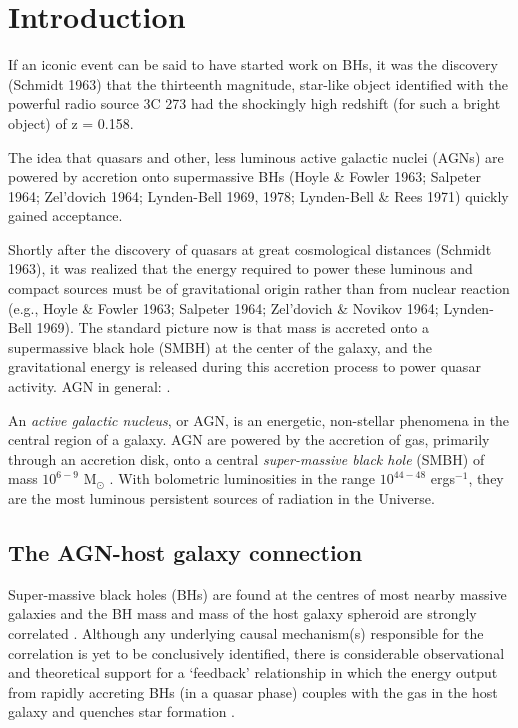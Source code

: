 
\chapter{Introduction}
\label{ch:intro}

If an iconic event can be said to have started work on BHs, it was the discovery (Schmidt
1963) that the thirteenth magnitude, star-like object identified with the powerful radio source 3C
273 had the shockingly high redshift (for such a bright object) of z = 0.158.

The idea that quasars and other, less luminous active galactic nuclei (AGNs) are powered by accretion onto supermassive BHs (Hoyle \& Fowler 1963; Salpeter 1964; Zel’dovich 1964; Lynden-Bell 1969, 1978; Lynden-Bell \& Rees 1971) quickly gained acceptance. 

Shortly after the discovery of quasars at great cosmological distances (Schmidt 1963), it was realized that the energy required to power these luminous and compact sources must be of gravitational origin rather than from nuclear reaction (e.g., Hoyle \& Fowler 1963; Salpeter 1964; Zel’dovich \& Novikov 1964; Lynden-Bell 1969). 
The standard picture now is that mass is accreted onto a supermassive black hole (SMBH) at the center of the galaxy, and the gravitational energy is released during this accretion process to power quasar activity.
AGN in general: \citet{peterson97}.

An {\it active galactic nucleus}, or AGN, is an energetic, non-stellar phenomena in the central region of a galaxy. AGN are powered by the accretion of gas, primarily through an accretion disk, onto a central {\it super-massive black hole} (SMBH) of mass $10^{6 - 9}$ M$_\odot$ \citep{lynden-bell69}. 
With bolometric luminosities in the range $10^{44 - 48}$ ergs$^{-1}$, they are the most luminous persistent sources of radiation in the Universe. 

\section{The AGN-host galaxy connection}

Super-massive black holes (BHs) are found at the centres of most nearby massive galaxies \citep[e.g.][]{kormendy95,ferrarese05,kormendy13} and the BH mass and mass of the host galaxy spheroid are strongly correlated \citep{ferrarese00,gebhardt00,graham01,tremaine02,marconi03,aller07,gultekin09}.  
Although any underlying causal mechanism(s) responsible for the correlation is yet to be conclusively identified, there is considerable observational and theoretical support for a `feedback' relationship in which the energy output from rapidly accreting BHs (in a quasar phase) couples with the gas in the host galaxy and quenches star formation \citep[e.g.][]{silk98,king03,dimatteo05,king15}. 

